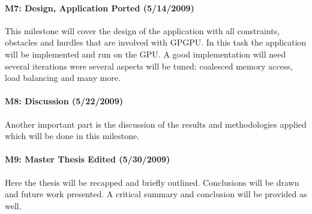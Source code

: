 \paragraph{M7: Design, Application Ported (5/14/2009)} %
\label{par:m7_design_application_ported}
This milestone will cover the design of the application with all constraints,
obstacles and hurdles that are involved with GPGPU. In this task the application
will be implemented and run on the GPU. A good implementation will need several
iterations were several aspects will be tuned: coalesced memory access, load
balancing and many more.
\paragraph{M8: Discussion (5/22/2009)} %
\label{par:m8_discussion}
Another important part is the discussion of the results and methodologies
applied which will be done in this milestone.

\paragraph{M9: Master Thesis Edited (5/30/2009)} %
\label{par:master_thesis_edited}
Here the thesis will be recapped and briefly outlined. Conclusions will be drawn
and future work presented. A critical summary and conclusion will be provided as
well. %


 



